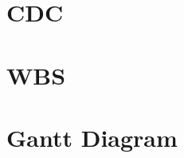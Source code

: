 \clearpage\section{CDC}
\begin{minipage}{\textwidth}
    
\end{minipage}


\clearpage\section{WBS}
\begin{minipage}{\textwidth}

\end{minipage}

\clearpage\section{Gantt Diagram}
\begin{minipage}{\textwidth}

\end{minipage}


